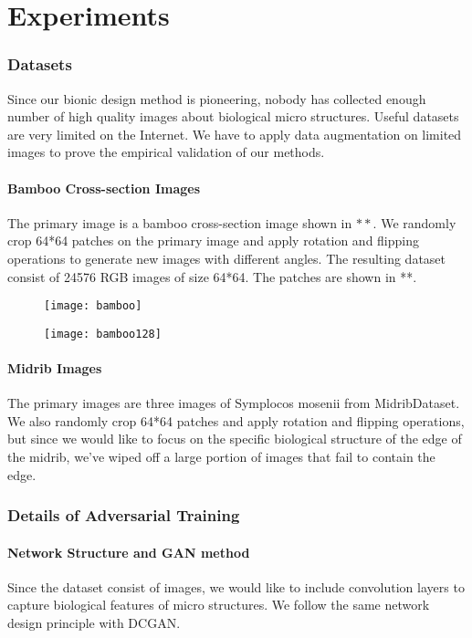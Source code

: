 \chapter{Experiments}

\subsection{Datasets}
Since our bionic design method is pioneering, nobody has collected enough number of high quality images about biological micro structures. Useful datasets are very limited on the Internet. We have to apply data augmentation on limited images to prove the empirical validation of our methods.

\subsubsection{Bamboo Cross-section Images}
The primary image is a bamboo cross-section image shown in $**$. We randomly crop 64*64 patches on the primary image and apply rotation and flipping operations to generate new images with different angles. The resulting dataset consist of 24576 RGB images of size 64*64. The patches are shown in **.
\begin{figure}
	\centering
	\texttt{[image: bamboo]}
	\label{fig:10}
\end{figure}
\begin{figure}
	\centering
	\texttt{[image: bamboo128]}
	\label{fig:10}
\end{figure}
\subsubsection{Midrib Images}
The primary images are three images of Symplocos mosenii from MidribDataset. We also randomly crop 64*64 patches and apply rotation and flipping operations, but since we would like to focus on the specific biological structure of the edge of the midrib, we’ve wiped off a large portion of images that fail to contain the edge. 

\subsection{Details of Adversarial Training}

\subsubsection{Network Structure and GAN method}
Since the dataset consist of images, we would like to include convolution layers to capture biological features of micro structures. We follow the same network design principle with DCGAN.

